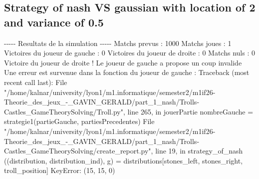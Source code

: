\documentclass{article}%
\begin{document}
%
\subsection{Strategy of nash VS gaussian with location of 2 and variance of 0.5}%
\label{subsec:Strategy of nash VS gaussian with location of 2 and variance of 0.5}%
{-}{-}{-}{-}{-} Resultats de la simulation {-}{-}{-}{-}{-}\newline%
		\newline%
Matchs prevus : 1000\newline%
Matchs joues : 1\newline%
\newline%
Victoires du joueur de gauche : 0\newline%
Victoires du joueur de droite : 0\newline%
Matchs nuls : 0\newline%
\newline%
Victoire du joueur de droite ! Le joueur de gauche a propose un coup invalide\newline%
Une erreur est survenue dans la fonction du joueur de gauche : \newline%
Traceback (most recent call last):\newline%
  File "/home/kalnar/university/lyon1/m1.informatique/semester2/m1if26{-}Theorie\_des\_jeux\_{-}\_GAVIN\_GERALD/part\_1\_nash/Trolls{-}Castles\_GameTheorySolving/Troll.py", line 265, in jouerPartie\newline%
    nombreGauche = strategie1(partieGauche, partiesPrecedentes)\newline%
  File "/home/kalnar/university/lyon1/m1.informatique/semester2/m1if26{-}Theorie\_des\_jeux\_{-}\_GAVIN\_GERALD/part\_1\_nash/Trolls{-}Castles\_GameTheorySolving/create\_report.py", line 19, in strategy\_of\_nash\newline%
    ((distribution, distribution\_ind), g) = distributions{[}stones\_left, stones\_right, troll\_position{]}\newline%
KeyError: (15, 15, 0)\newline%

%
\end{document}
